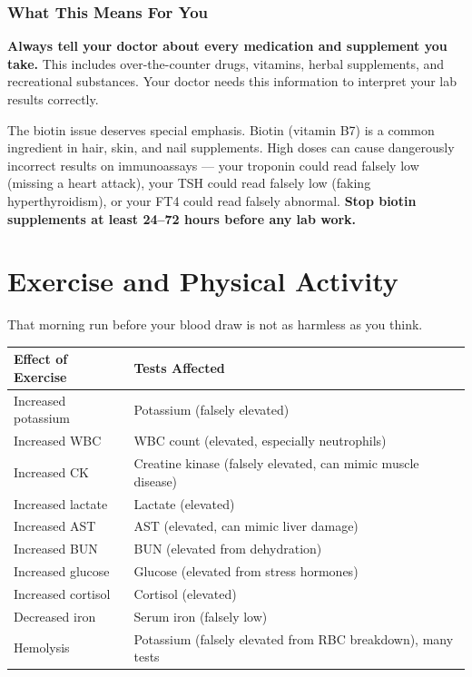 \subsubsection{What This Means For You}

\textbf{Always tell your doctor about every medication and supplement you take.} This includes over-the-counter drugs, vitamins, herbal supplements, and recreational substances. Your doctor needs this information to interpret your lab results correctly.

The biotin issue deserves special emphasis. Biotin (vitamin B7) is a common ingredient in hair, skin, and nail supplements. High doses can cause dangerously incorrect results on immunoassays --- your troponin could read falsely low (missing a heart attack), your TSH could read falsely low (faking hyperthyroidism), or your FT4 could read falsely abnormal. \textbf{Stop biotin supplements at least 24--72 hours before any lab work.}

\clearpage
\section{Exercise and Physical Activity}

That morning run before your blood draw is not as harmless as you think.

\begin{longtable}{@{}p{4.5cm}p{10.5cm}@{}}
\toprule
\textbf{Effect of Exercise} & \textbf{Tests Affected} \\
\midrule
Increased potassium & Potassium (falsely elevated) \\
Increased WBC & WBC count (elevated, especially neutrophils) \\
Increased CK & Creatine kinase (falsely elevated, can mimic muscle disease) \\
Increased lactate & Lactate (elevated) \\
Increased AST & AST (elevated, can mimic liver damage) \\
Increased BUN & BUN (elevated from dehydration) \\
Increased glucose & Glucose (elevated from stress hormones) \\
Increased cortisol & Cortisol (elevated) \\
Decreased iron & Serum iron (falsely low) \\
Hemolysis & Potassium (falsely elevated from RBC breakdown), many tests \\
\bottomrule
\end{longtable}

